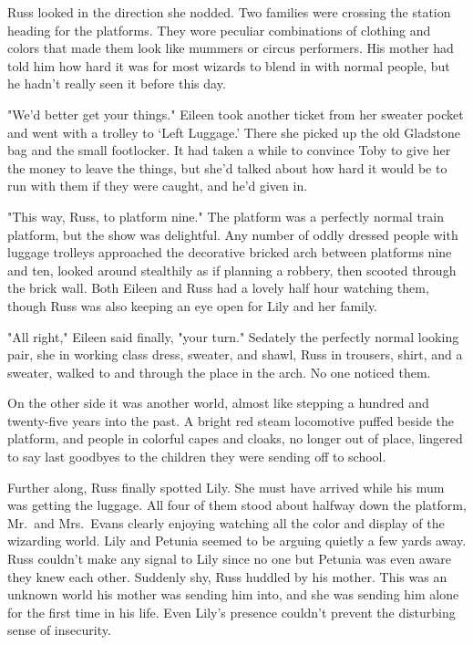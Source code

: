 Russ looked in the direction she nodded. Two families were crossing the station heading for the platforms. They wore peculiar combinations of clothing and colors that made them look like mummers or circus performers. His mother had told him how hard it was for most wizards to blend in with normal people, but he hadn't really seen it before this day.

"We'd better get your things." Eileen took another ticket from her sweater pocket and went with a trolley to `Left Luggage.' There she picked up the old Gladstone bag and the small footlocker. It had taken a while to convince Toby to give her the money to leave the things, but she'd talked about how hard it would be to run with them if they were caught, and he'd given in.

"This way, Russ, to platform nine." The platform was a perfectly normal train platform, but the show was delightful. Any number of oddly dressed people with luggage trolleys approached the decorative bricked arch between platforms nine and ten, looked around stealthily as if planning a robbery, then scooted through the brick wall. Both Eileen and Russ had a lovely half hour watching them, though Russ was also keeping an eye open for Lily and her family.

"All right," Eileen said finally, "your turn." Sedately the perfectly normal looking pair, she in working class dress, sweater, and shawl, Russ in trousers, shirt, and a sweater, walked to and through the place in the arch. No one noticed them.

On the other side it was another world, almost like stepping a hundred and twenty-five years into the past. A bright red steam locomotive puffed beside the platform, and people in colorful capes and cloaks, no longer out of place, lingered to say last goodbyes to the children they were sending off to school.

Further along, Russ finally spotted Lily. She must have arrived while his mum was getting the luggage. All four of them stood about halfway down the platform, Mr.~and Mrs.~Evans clearly enjoying watching all the color and display of the wizarding world. Lily and Petunia seemed to be arguing quietly a few yards away. Russ couldn't make any signal to Lily since no one but Petunia was even aware they knew each other. Suddenly shy, Russ huddled by his mother. This was an unknown world his mother was sending him into, and she was sending him alone for the first time in his life. Even Lily's presence couldn't prevent the disturbing sense of insecurity.

